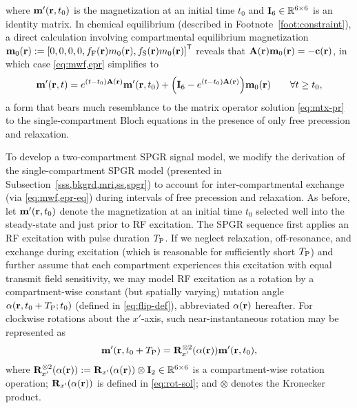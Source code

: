 where $\bmmp\prtz$ is the magnetization
at an initial time $t_0$
and $\mathbf{I}_{6} \in \mathbb{R}^{6 \times 6}$ 
is an identity matrix.
In chemical equilibrium
(described in Footnote~\ref{foot:constraint}),
a direct calculation involving 
compartmental equilibrium magnetization
$\bmmzero\pr := \brac{0,0,0,0,\ff\pr\mzero\pr,\fs\pr\mzero\pr}\tpose$
reveals that $\bmA\pr \bmmzero\pr = -\bmc\pr$,
in which case \eqref{eq:mwf,epr} simplifies to
\begin{align}
	\bmmp\prt = e^{\paren{t-t_0}\bmA\pr} \bmmp\prtz +
		\paren{\eye{6} - e^{\paren{t-t_0}\bmA\pr}} \bmmzero\pr
		\qquad \forall t \geq t_0,
		\label{eq:mwf,epr-eq}
\end{align}
a form
that bears much resemblance  
to the matrix operator solution
\eqref{eq:mtx-pr}
to the single-compartment Bloch equations
in the presence
of only free precession and relaxation.

To develop a two-compartment SPGR signal model,
we modify the derivation 
of the single-compartment SPGR model
(presented in Subsection~\ref{sss,bkgrd,mri,ss,spgr})
to account for inter-compartmental exchange
(via \eqref{eq:mwf,epr-eq})
during intervals of free precession and relaxation.
As before,
let $\bmmp\prtz$ denote the magnetization
at an initial time $t_0$ selected 
well into the steady-state
and just prior to RF excitation.
The SPGR sequence first applies
an RF excitation
with pulse duration $T_\mathrm{P}$.
If we neglect relaxation,
off-resonance,
and exchange during excitation
(which is reasonable 
for sufficiently short $T_\mathrm{P}$) 
and further assume
that each compartment 
experiences this excitation
with equal transmit field sensitivity,
we may model RF excitation as a rotation
by a compartment-wise constant 
(but spatially varying)
nutation angle $\flip\prtzt{t_0+\TP}$
(defined in \eqref{eq:flip-def}),
abbreviated $\flip\pr$ hereafter.
For clockwise rotations
about the $x'$-axis,
such near-instantaneous rotation
may be represented as
\begin{align}
	\bmmp\paren{\bmr,t_0+\TP} = 
		\bmRxpsix{\flip\pr} \bmmp\prtz,
		\label{eq:mwf,spgr-ex}
\end{align}
where $\bmRxpsix{\flip\pr} := \bmRxp{\flip\pr} \otimes \eye{2} 
\in \reals{6 \times 6}$
is a compartment-wise rotation operation;
$\bmRxp{\flip\pr}$ is defined in \eqref{eq:rot-sol};
and $\otimes$ denotes the Kronecker product.

